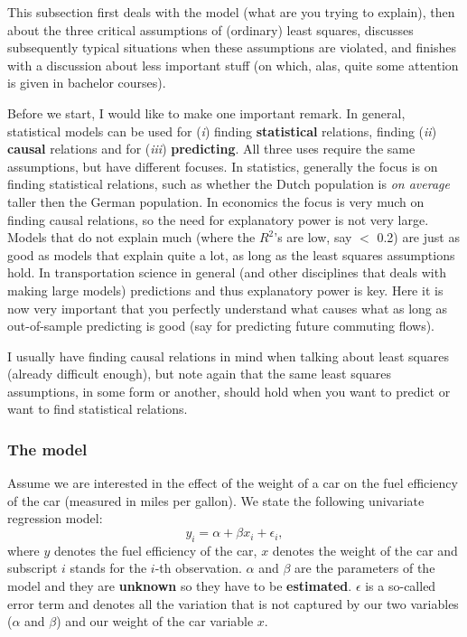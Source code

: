 \documentclass[]{article}
\theoremstyle{definition}
\theoremstyle{definition}
\theoremstyle{definition}
\theoremstyle{remark}
\begin{document}
This subsection first deals with the model (what are you trying to
explain), then about the three critical assumptions of (ordinary) least
squares, discusses subsequently typical situations when these
assumptions are violated, and finishes with a discussion about less
important stuff (on which, alas, quite some attention is given in
bachelor courses).

Before we start, I would like to make one important remark. In general,
statistical models can be used for (\emph{i}) finding
\textbf{statistical} relations, finding (\emph{ii}) \textbf{causal}
relations and for (\emph{iii}) \textbf{predicting}. All three uses
require the same assumptions, but have different focuses. In statistics,
generally the focus is on finding statistical relations, such as whether
the Dutch population is \emph{on average} taller then the German
population. In economics the focus is very much on finding causal
relations, so the need for explanatory power is not very large. Models
that do not explain much (where the \(R^2\)'s are low, say \(<\) 0.2)
are just as good as models that explain quite a lot, as long as the
least squares assumptions hold. In transportation science in general
(and other disciplines that deals with making large models) predictions
and thus explanatory power is key. Here it is now very important that
you perfectly understand what causes what as long as out-of-sample
predicting is good (say for predicting future commuting flows).

I usually have finding causal relations in mind when talking about least
squares (already difficult enough), but note again that the same least
squares assumptions, in some form or another, should hold when you want
to predict or want to find statistical relations.

\subsubsection{The model}\label{the-model}

Assume we are interested in the effect of the weight of a car on the
fuel efficiency of the car (measured in miles per gallon). We state the
following univariate regression model: \[
y_i = \alpha + \beta x_i + \epsilon_i,
\] where \(y\) denotes the fuel efficiency of the car, \(x\) denotes the
weight of the car and subscript \(i\) stands for the \(i\)-th
observation. \(\alpha\) and \(\beta\) are the parameters of the model
and they are \textbf{unknown} so they have to be \textbf{estimated}.
\(\epsilon\) is a so-called error term and denotes all the variation
that is not captured by our two variables (\(\alpha\) and \(\beta\)) and
our weight of the car variable \(x\).
\end{document}
